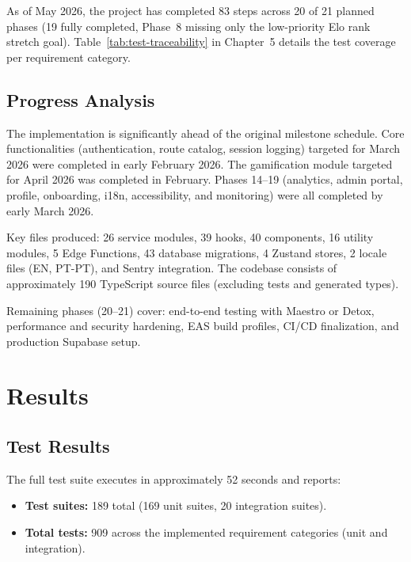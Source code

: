 \documentclass[12pt,a4paper]{report}
\renewcommand\_{\textunderscore\hspace{0pt}}
\begin{document}
As of May 2026, the project has completed 83 steps across 20 of 21 planned phases (19 fully completed, Phase~8 missing only the low-priority Elo rank stretch goal). Table~\ref{tab:test-traceability} in Chapter~5 details the test coverage per requirement category.

\section{Progress Analysis}

The implementation is significantly ahead of the original milestone schedule. Core functionalities (authentication, route catalog, session logging) targeted for March 2026 were completed in early February 2026. The gamification module targeted for April 2026 was completed in February. Phases 14--19 (analytics, admin portal, profile, onboarding, i18n, accessibility, and monitoring) were all completed by early March 2026.

Key files produced: 26 service modules, 39 hooks, 40 components, 16 utility modules, 5 Edge Functions, 43 database migrations, 4 Zustand stores, 2 locale files (EN, PT-PT), and Sentry integration. The codebase consists of approximately 190 TypeScript source files (excluding tests and generated types).

Remaining phases (20--21) cover: end-to-end testing with Maestro or Detox, performance and security hardening, EAS build profiles, CI/CD finalization, and production Supabase setup.

\chapter{Results}

\section{Test Results}

The full test suite executes in approximately 52 seconds and reports:

\begin{itemize}[noitemsep]
    \item \textbf{Test suites:} 189 total (169 unit suites, 20 integration suites\footnotemark).
    \item \textbf{Total tests:} 909 across the implemented requirement categories (unit and integration).
\end{itemize}
\end{document}
